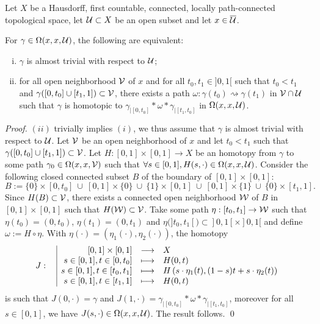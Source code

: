 \begin{lem} \label{lem:almost_homotopic_carac}
 Let $X$ be a Hausdorff, first countable, connected, locally path-connected topological space, let $\mathcal{U}\subset X$ be an open subset and let $x \in  \overline {\mathcal{U}}$.
 
 For $\gamma \in \Omega(x,x,\mathcal{U})$,  the following are equivalent:
 \begin{enumerate}[(i)]
  \item $\gamma$ is almost trivial with respect to $\mathcal{U}$;
  \item for all open neighborhood $\mathcal V$ of $x$ and for all $t_0,t_1\in ]0,1[$ such that $t_0<t_1$ and $\gamma([0,t_0]\cup [t_1,1])\subset \mathcal V$, there exists a path $\omega : \gamma(t_0)\rightsquigarrow \gamma(t_1)$ in $\mathcal V\cap \mathcal{U}$ such that $\gamma$ is homotopic to $\gamma_{|[0,t_0]}*\omega*\gamma_{|[t_1,t_0]}$ in $\Omega(x,x,\mathcal{U})$.
 \end{enumerate}
\end{lem}
\begin{proof}
  $(ii)$ trivially implies $(i)$, we thus assume that $\gamma$ is almost trivial with respect to $\mathcal{U}$. Let $\mathcal V$ be an open neighborhood of $x$ and let $t_0<t_1$ such that $\gamma([0,t_0]\cup[t_1,1])\subset \mathcal V$. Let $H:[0,1]\times [0,1]\rightarrow X$ be an homotopy from $\gamma$ to some path $\gamma_0\in \Omega(x,x
  ,\mathcal V)$ such that $\forall s\in [0,1], H(s,\cdot)\in \Omega(x,x,\mathcal{U})$. 
  Consider the following closed connected subset $B$ of the boundary of $[0,1]\times [0,1]$:$$B := \{0\}\times [0,t_0]\ \cup\ [0,1]\times \{0\}\ \cup\ \{1\}\times [0,1]\ \cup\ [0,1]\times\{1\}\ \cup\ \{0\}\times [t_1,1].$$
  Since $H(B)\subset \mathcal V$, there exists a connected open neighborhood $\mathcal W$ of $B$ in $[0,1]\times [0,1]$ such that $H(\mathcal W)\subset \mathcal V$. Take some path $\eta:[t_0,t_1]\rightarrow \mathcal W$ such that $\eta(t_0)=(0,t_0)$, $\eta(t_1)=(0,t_1)$ and $\eta(]t_0,t_1[)\subset ]0,1[\times ]0,1[$ and define $\omega:=H\circ \eta$. 
  With $\eta(\cdot)=(\eta_1(\cdot),\eta_2(\cdot))$, the homotopy $$\displaystyle J:\begin{array}{l|rcl} & \displaystyle [0,1]\times [0,1] & \longrightarrow & \displaystyle X \\ & \displaystyle s\in [0,1],t\in [0,t_0] & \longmapsto & \displaystyle H(0,t)\\ & \displaystyle s\in [0,1], t\in [t_0,t_1] & \longmapsto & \displaystyle H\left(s\cdot\eta_1(t),(1-s)t+s\cdot\eta_2(t)\right)\\ & \displaystyle s\in [0,1],t\in [t_1,1] & \longmapsto & \displaystyle H(0,t)\end{array}$$
  is such that $J(0,\cdot)=\gamma$ and $J(1,\cdot)=\gamma_{|[0,t_0]}*\omega*\gamma_{|[t_1,t_0]}$, moreover  for all $ s\in[0,1]$, we have $J(s,\cdot)\in \Omega(x,x,\mathcal{U})$. The result follows.
\qed\end{proof}


